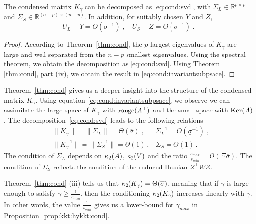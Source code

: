 \begin{corollary}
  The condensed matrix $K_\gamma$ can be decomposed as
  \eqref{eq:cond:svd}, with $\Sigma_L \in \mathbb{R}^{p \times p}$ and $\Sigma_S \in \mathbb{R}^{(n-p) \times (n-p)}$.
  In addition, for suitably chosen $Y$ and $Z$,
  \begin{equation}
    \label{eq:cond:invariantsubpsace}
    U_L - Y = O(\underline{\sigma}^{-1}) \; , \quad
    U_S - Z = O(\underline{\sigma}^{-1}) \; .
  \end{equation}
\end{corollary}
\begin{proof}
  According to Theorem~\ref{thm:cond}, the $p$ largest eigenvalues of $K_\gamma$ are large
  and well separated from the $n - p$ smallest eigenvalues. Using
  the spectral theorem, we obtain the decomposition as \eqref{eq:cond:svd}.
  Using Theorem \ref{thm:cond}, part (iv), we obtain the result
  in \eqref{eq:cond:invariantsubpsace}.
\end{proof}
Theorem~\ref{thm:cond} gives us a deeper insight into the structure
of the condensed matrix $K_\gamma$.
Using equation~\eqref{eq:cond:invariantsubpsace}, we observe
we can assimilate the large-space of $K_\gamma$ with $\operatorname{range}(A^\top)$
and the small space with $\operatorname{Ker}(A)$.
The decomposition~\eqref{eq:cond:svd} leads to the following relations
\begin{equation}
  \label{eq:cond:boundinvariantsubspace}
  \begin{aligned}
    & \| K_\gamma \| = \| \Sigma_L \| = \Theta(\overline{\sigma}) \; , &
    \Sigma_L^{-1} = O(\underline{\sigma}^{-1})  \;, \\
    & \| K_\gamma^{-1} \| = \| \Sigma_S^{-1} \| = \Theta(1) \, , &
  \Sigma_S = \Theta(1) \, .
  \end{aligned}
\end{equation}
The condition of $\Sigma_L$ depends on $\kappa_2(A)$, $\kappa_2(V)$
and the ratio $\frac{s_{max}}{s_{min}} = O(\Xi \overline{\sigma})$.
The condition of $\Sigma_S$ reflects the condition of the reduced Hessian $Z^\top W Z$.

\begin{remark}
  Theorem~\ref{thm:cond} (iii) tells us that $\kappa_2(K_\gamma) = \Theta(\overline{\sigma})$,
  meaning that if $\gamma$ is large-enough to satisfy $\gamma \geq \frac{1}{s_{min}}$, then
  the conditioning $\kappa_2(K_\gamma)$ increases linearly with $\gamma$. In
  other words, the value $\frac{1}{s_{min}}$ gives us a lower-bound for $\gamma_{max}$
  in Proposition~\ref{prop:kkt:hykkt:cond}.
\end{remark}


